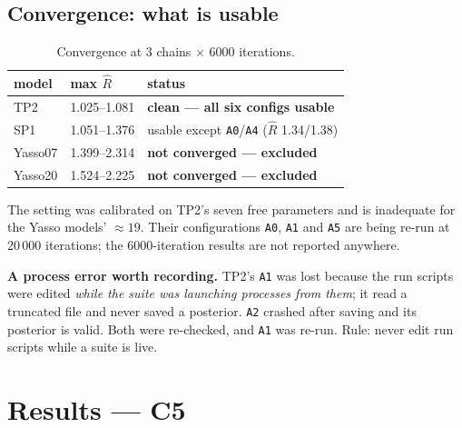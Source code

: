 \documentclass[11pt]{article}
\begin{document}
\subsection{Convergence: what is usable}
\begin{table}[H]\centering\small
\caption{Convergence at 3 chains $\times$ 6000 iterations.}
\begin{tabular}{lll}\toprule
model & max $\hat{R}$ & status\\\midrule
TP2 & 1.025--1.081 & \textbf{clean --- all six configs usable}\\
SP1 & 1.051--1.376 & usable except \texttt{A0}/\texttt{A4} ($\hat{R}$ 1.34/1.38)\\
Yasso07 & 1.399--2.314 & \textbf{not converged --- excluded}\\
Yasso20 & 1.524--2.225 & \textbf{not converged --- excluded}\\\bottomrule
\end{tabular}
\end{table}

\noindent The setting was calibrated on TP2's seven free parameters and is inadequate for the
Yasso models' $\approx 19$. Their configurations \texttt{A0}, \texttt{A1} and \texttt{A5} are
being re-run at 20\,000 iterations; the 6000-iteration results are not reported anywhere.

\begin{caveat}
\textbf{A process error worth recording.} TP2's \texttt{A1} was lost because the run scripts
were edited \emph{while the suite was launching processes from them}; it read a truncated file
and never saved a posterior. \texttt{A2} crashed after saving and its posterior is valid. Both
were re-checked, and \texttt{A1} was re-run. Rule: never edit run scripts while a suite is live.
\end{caveat}

\section{Results --- C5}
\end{document}
